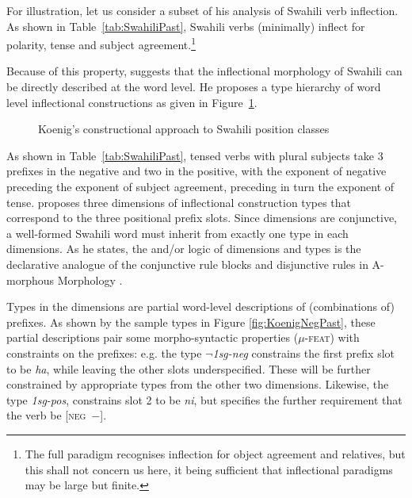 For illustration, let us consider a subset of his analysis of Swahili
verb inflection. As shown in Table~\ref{tab:SwahiliPast}, Swahili
verbs (minimally) inflect for polarity, tense and subject
agreement.\footnote{The full paradigm recognises inflection for object
agreement and relatives, but this shall not concern us here, it being
sufficient that inflectional paradigms may be large but finite.} 

Because of this property, \citet{Koenig99} suggests that the
inflectional morphology of Swahili can be directly described at the
word level. He proposes a type hierarchy of word level inflectional
constructions as given in Figure~\ref{fig:KoenigSwahili}. 

\begin{figure}[htb]
  \centering
  
  \begin{tree}
  \end{tree}

  
  \caption{Koenig's constructional approach to Swahili position
    classes}
  \label{fig:KoenigSwahili}
\end{figure}

As shown in Table~\ref{tab:SwahiliPast}, tensed verbs with plural
subjects take 3 prefixes in the negative and two in the positive, with
the exponent of negative preceding the exponent of subject agreement,
preceding in turn the exponent of tense. \citet{Koenig99} proposes
three dimensions of inflectional construction types that correspond to
the three positional prefix slots. Since dimensions are conjunctive, a
well-formed Swahili word must inherit from exactly one type in each
dimensions. As he states, the and/or logic of dimensions and types is
the declarative analogue of the conjunctive rule blocks and
disjunctive rules in A-morphous Morphology \citep{Anderson92}.

Types in the dimensions are partial word-level descriptions of
(combinations of) prefixes. As shown by the sample types in Figure
\ref{fig:KoenigNegPast}, these partial descriptions pair some
morpho-syntactic properties (\textsc{$\mu$-feat}) with constraints on
the prefixes: e.g. the type \textit{$\neg$1sg-neg} constrains the
first prefix slot to be \textit{ha}, while leaving the other slots
underspecified. These will be further constrained by appropriate types
from the other two dimensions. Likewise, the type \textit{1sg-pos},
constrains slot 2 to be \textit{ni}, but specifies the further
requirement that the verb be \textsc{[neg~$-$]}.    

